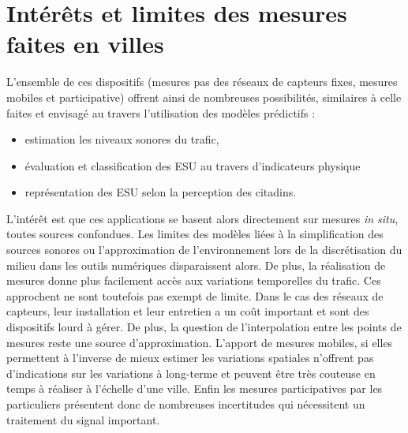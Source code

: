 \section{Intérêts et limites des mesures faites en villes}

L'ensemble de ces dispositifs (mesures pas des réseaux de capteurs fixes, mesures mobiles et participative) offrent ainsi de nombreuses possibilités, similaires à celle faites et envisagé au travers l'utilisation des modèles prédictifs : 
\begin{itemize}
\item estimation les niveaux sonores du trafic, 
\item évaluation et classification des ESU au travers d'indicateurs physique
\item représentation des ESU selon la perception des citadins.
\end{itemize}
L'intérêt est que ces applications se basent alors directement sur mesures \textit{in situ}, toutes sources confondues. Les limites des modèles liées à la simplification des sources sonores ou l'approximation de l'environnement lors de la discrétisation du milieu dans les outils numériques disparaissent alors. De plus, la réalisation de mesures donne plus facilement accès aux variations temporelles du trafic. 
Ces approchent ne sont toutefois pas exempt de limite. Dans le cas des réseaux de capteurs, leur installation et leur entretien a un coût important et sont des dispositifs lourd à gérer. De plus, la question de l'interpolation entre les points de mesures reste une source d'approximation. L'apport de mesures mobiles, si elles permettent à l'inverse de mieux estimer les variations spatiales n'offrent pas d'indications sur les variations à long-terme et peuvent être très couteuse en temps à réaliser à l'échelle d'une ville. Enfin les mesures participatives par les particuliers présentent donc de nombreuses incertitudes qui nécessitent un traitement du signal important. 

